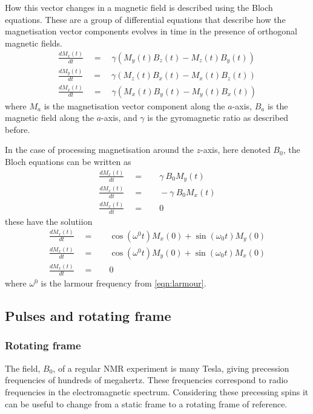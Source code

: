 How this vector changes in a magnetic field is described using the Bloch equations\citep{Bloch:1946hk}. These are a group of differential equations that
describe how the magnetisation vector components evolves in time in the
presence of orthogonal magnetic fields.
\begin{align}\label{eqn:Bloch}
  \frac{dM_x(t)}{dt}\quad=\quad\gamma(M_y(t)B_z(t)-M_z(t)B_y(t))\\
  \frac{dM_y(t)}{dt}\quad=\quad\gamma(M_z(t)B_x(t)-M_x(t)B_z(t))\\
  \frac{dM_x(t)}{dt}\quad=\quad\gamma(M_x(t)B_y(t)-M_y(t)B_x(t))
\end{align}
where $M_a$ is the magnetisation vector component along the $a$-axis, $B_a$ is the
magnetic field along the $a$-axis, and $\gamma$ is the gyromagnetic ratio as described before.

In the case of processing magnetisation around the $z$-axis, here denoted $B_0$, the
Bloch equations can be written as
\begin{align}
  \frac{dM_x(t)}{dt}\quad=&\quad\gamma~B_0M_y(t)\\
  \frac{dM_x(t)}{dt}\quad=&\quad-\gamma~B_0M_x(t)\\
  \frac{dM_x(t)}{dt}\quad=&\quad0
\end{align}
these have the solutiion
\begin{align}
  \frac{dM_x(t)}{dt}\quad=&\quad\cos(\omega^0t)M_x(0) + \sin(\omega_0t)M_y(0)\\
  \frac{dM_x(t)}{dt}\quad=&\quad\cos(\omega^0t)M_y(0) + \sin(\omega_0t)M_x(0)\\
  \frac{dM_x(t)}{dt}\quad=&\quad0
\end{align}
where $\omega^0$ is the larmour frequency from \ref{eqn:larmour}.

\subsection{Pulses and rotating frame}

\subsubsection{Rotating frame}

The field, $B_0$, of a regular NMR experiment is many Tesla, giving precession
frequencies of hundreds of megahertz. These frequencies correspond to radio frequencies in the electromagnetic spectrum. Considering these precessing spins
it can be useful to change from a static frame to a rotating frame of reference.

